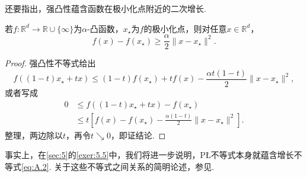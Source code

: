 还要指出，强凸性蕴含函数在极小化点附近的二次增长.
\begin{lemma}\label{lem:A.12}
若$f:\mathbb R^d\to\mathbb R\cup\{\infty\}$为$\alpha$-凸函数，$x_\star$为$f$的极小化点，则对任意$x\in\mathbb R^d$，
\begin{equation}\label{eq:A.2}
f(x)-f(x_\star)\geq\frac\alpha2\|x-x_\star\|^2.
\end{equation}
\end{lemma}
\begin{proof}
强凸性不等式给出
$$
f((1-t)x_\star+tx)\leq(1-t)f(x_\star)+tf(x)
-\frac{\alpha t(1-t)}2\|x-x_\star\|^2,
$$
或者写成
$$
\begin{aligned}
0&\leq f((1-t)x_\star+tx)-f(x_\star)\\
&\leq t\left[f(x)-f(x_\star)-\frac{\alpha(1-t)}2\|x-x_\star\|^2\right].
\end{aligned}
$$
整理，两边除以$t$，再令$t\searrow0$，即证结论.
\end{proof}

事实上，在\autoref{sec:5}的\autoref{exer:5.5}中，我们将进一步说明，PŁ不等式本身就蕴含增长不等式\eqref{eq:A.2}. 关于这些不等式之间关系的简明论述，参见\cite[附录A]{ref174}.
